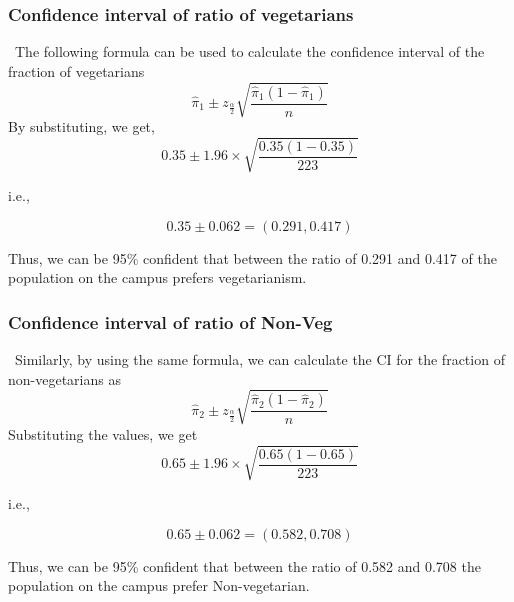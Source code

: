 \documentclass{beamer}
\begin{document}
\begin{frame}
    \frametitle{Confidence interval of ratio of vegetarians }\
    The following formula can be used to calculate the confidence interval of the fraction  of vegetarians 
    \begin{equation}
    \hat{\pi}_1 \pm z_{\frac{\alpha}{2}} \sqrt{\frac{\hat{\pi}_1(1 - \hat{\pi}_1)}{n}}
    \end{equation}
    By substituting, we get,
    \begin{equation}
    0.35 \pm 1.96 \times \sqrt{\frac{0.35(1 - 0.35)}{223}}
    \end{equation}
    
    i.e.,

    \[
    0.35 \pm 0.062 = (0.291, 0.417)
    \]

    
    Thus, we can be 95\% confident that between the ratio of 0.291 and 0.417 of the population on the campus prefers vegetarianism.
    
\end{frame}
\begin{frame}
    \frametitle{Confidence interval of ratio of Non-Veg }\
    Similarly, by using the same formula, we can calculate the CI for the fraction of non-vegetarians as
    \begin{equation}
    \hat{\pi}_2 \pm z_{\frac{\alpha}{2}} \sqrt{\frac{\hat{\pi}_2(1 - \hat{\pi}_2)}{n}}
    \end{equation}
    Substituting the values, we get
    \begin{equation}
    0.65 \pm 1.96 \times \sqrt{\frac{0.65(1 - 0.65)}{223}}
    \end{equation}
    
    i.e.,

    \[
    0.65 \pm 0.062 = (0.582, 0.708)
    \]

    
    Thus, we can be 95\% confident that between the ratio of 0.582 and 0.708 the population on the campus prefer Non-vegetarian.
    
\end{frame}




\end{document}
